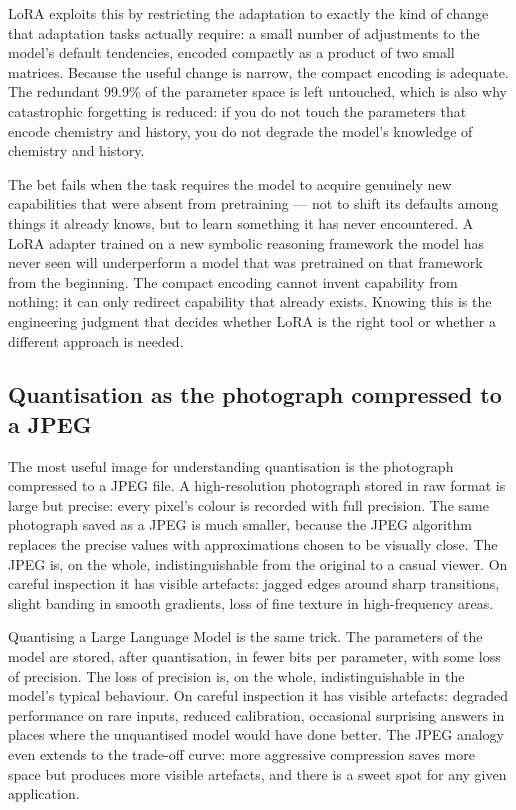 LoRA exploits this by restricting the adaptation to exactly the
kind of change that adaptation tasks actually require: a small
number of adjustments to the model's default tendencies, encoded
compactly as a product of two small matrices. Because the useful
change is narrow, the compact encoding is adequate. The redundant
99.9\% of the parameter space is left untouched, which is also
why catastrophic forgetting is reduced: if you do not touch the
parameters that encode chemistry and history, you do not degrade
the model's knowledge of chemistry and history.

The bet fails when the task requires the model to acquire
genuinely new capabilities that were absent from pretraining ---
not to shift its defaults among things it already knows, but to
learn something it has never encountered. A LoRA adapter trained
on a new symbolic reasoning framework the model has never seen
will underperform a model that was pretrained on that framework
from the beginning. The compact encoding cannot invent capability
from nothing; it can only redirect capability that already exists.
Knowing this is the engineering judgment that decides whether LoRA
is the right tool or whether a different approach is needed.

\subsection*{Quantisation as the photograph compressed to a JPEG}

The most useful image for understanding quantisation is the
photograph compressed to a JPEG file. A high-resolution
photograph stored in raw format is large but precise: every
pixel's colour is recorded with full precision. The same
photograph saved as a JPEG is much smaller, because the JPEG
algorithm replaces the precise values with approximations
chosen to be visually close. The JPEG is, on the whole,
indistinguishable from the original to a casual viewer. On
careful inspection it has visible artefacts: jagged edges
around sharp transitions, slight banding in smooth gradients,
loss of fine texture in high-frequency areas.

Quantising a Large Language Model is the same trick. The
parameters of the model are stored, after quantisation, in
fewer bits per parameter, with some loss of precision. The
loss of precision is, on the whole, indistinguishable in the
model's typical behaviour. On careful inspection it has visible
artefacts: degraded performance on rare inputs, reduced
calibration, occasional surprising answers in places where the
unquantised model would have done better. The JPEG analogy
even extends to the trade-off curve: more aggressive
compression saves more space but produces more visible
artefacts, and there is a sweet spot for any given application.

